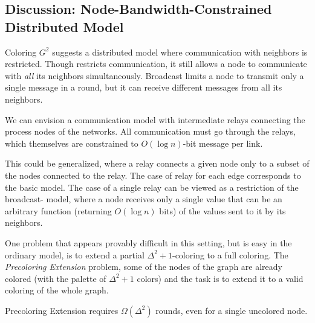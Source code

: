 
%


\subsection{Discussion: Node-Bandwidth-Constrained Distributed Model}
\label{sec:cap}

Coloring $G^2$ suggests a distributed model where communication with neighbors is restricted. Though {\congest} restricts communication, it still allows a node to communicate with \emph{all} its neighbors simultaneously.
Broadcast {\congest} limits a node to transmit only a single message in a round, but it can receive different messages from all its neighbors.

% 
We can envision a communication model with intermediate relays connecting the process nodes of the networks. All communication must go through the relays, which themselves are constrained to $O(\log n)$-bit message per link. 

This could be generalized, where a relay connects a given node only to a subset of the nodes connected to the relay.
The case of relay for each edge corresponds to the basic {\congest} model. The case of a single relay can be viewed as a restriction of the broadcast-{\congest} model, where a node receives only a single value that can be an arbitrary function (returning $O(\log n)$ bits) of the values sent to it by its neighbors.

One problem that appears provably difficult in this setting, but is easy in the ordinary {\congest} model, is to extend a partial $\Delta^2+1$-coloring to a full coloring. 
The \emph{Precoloring Extension} problem, some of the nodes of the graph are already colored (with the palette of $\Delta^2+1$ colors) and the task is to extend it to a valid coloring of the whole graph.
\begin{theorem}
Precoloring Extension requires $\Omega(\Delta^2)$ rounds, even for a single uncolored node.
\end{theorem}

